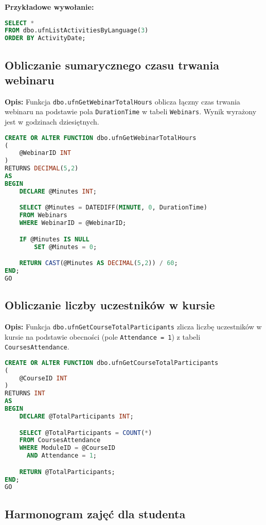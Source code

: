 \documentclass[12pt]{article}
\begin{document}
\textbf{Przykładowe wywołanie:}
\begin{lstlisting}[language=SQL]
SELECT *
FROM dbo.ufnListActivitiesByLanguage(3)
ORDER BY ActivityDate;
\end{lstlisting}

\subsection{Obliczanie sumarycznego czasu trwania webinaru}
\label{sec:webinar_total_hours}

\textbf{Opis:} Funkcja \texttt{dbo.ufnGetWebinarTotalHours} oblicza łączny czas trwania webinaru na podstawie pola \texttt{DurationTime} w tabeli \texttt{Webinars}. Wynik wyrażony jest w godzinach dziesiętnych.

 
\begin{lstlisting}[language=SQL]
CREATE OR ALTER FUNCTION dbo.ufnGetWebinarTotalHours
(
    @WebinarID INT
)
RETURNS DECIMAL(5,2)
AS
BEGIN
    DECLARE @Minutes INT;

    SELECT @Minutes = DATEDIFF(MINUTE, 0, DurationTime)
    FROM Webinars
    WHERE WebinarID = @WebinarID;

    IF @Minutes IS NULL
        SET @Minutes = 0;

    RETURN CAST(@Minutes AS DECIMAL(5,2)) / 60;
END;
GO
\end{lstlisting}

\subsection{Obliczanie liczby uczestników w kursie}
\label{sec:course_total_participants}

\textbf{Opis:} Funkcja \texttt{dbo.ufnGetCourseTotalParticipants} zlicza liczbę uczestników w kursie na podstawie obecności (pole \texttt{Attendance = 1}) z tabeli \texttt{CoursesAttendance}.

 
\begin{lstlisting}[language=SQL]
CREATE OR ALTER FUNCTION dbo.ufnGetCourseTotalParticipants
(
    @CourseID INT
)
RETURNS INT
AS
BEGIN
    DECLARE @TotalParticipants INT;

    SELECT @TotalParticipants = COUNT(*)
    FROM CoursesAttendance
    WHERE ModuleID = @CourseID
      AND Attendance = 1;

    RETURN @TotalParticipants;
END;
GO
\end{lstlisting}
\newpage
\subsection{Harmonogram zajęć dla studenta}
\label{sec:student_schedule}
\end{document}
